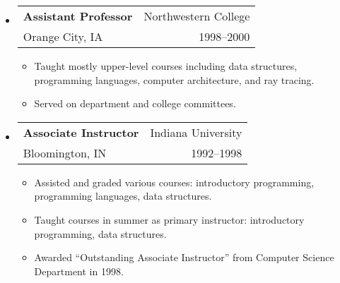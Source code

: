 \documentclass[letterpaper,10pt]{article}
\makeatletter
\newcommand{\resitem}[1]{\item #1 \vspace{-2pt}}
\newcommand{\ressubheading}[4]{ 
\begin{tabular*}{7in}{l@{\extracolsep{\fill}}r}
	\textbf{#1} & #2 \\
	{#3} & {#4} \\
\end{tabular*}
\vspace{-6pt}}
\makeatother
\begin{document}
\begin{itemize}
	\item \ressubheading{Assistant Professor}{Northwestern College}{Orange City, IA}{1998--2000} 
	\begin{itemize}
		\resitem{Taught mostly upper-level courses including data structures, programming languages, computer architecture, and ray tracing.}
		\resitem{Served on department and college committees.}
	\end{itemize}
	
	\item \ressubheading{Associate Instructor}{Indiana University}{Bloomington, IN}{1992--1998} 
	\begin{itemize}
		\resitem{Assisted and graded various courses: introductory programming, programming languages, data structures.}
		\resitem{Taught courses in summer as primary instructor: introductory programming, data structures.}
		\resitem{Awarded ``Outstanding Associate Instructor'' from Computer Science Department in 1998.}
	\end{itemize}
\end{itemize}
\end{document}

